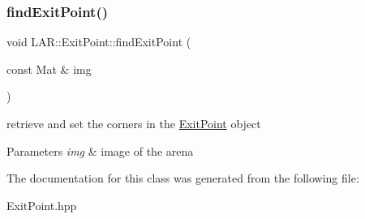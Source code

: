 \subsubsection{\texorpdfstring{find\+Exit\+Point()}{findExitPoint()}}
{\footnotesize\ttfamily void L\+A\+R\+::\+Exit\+Point\+::find\+Exit\+Point (\begin{DoxyParamCaption}\item[{const Mat \&}]{img }\end{DoxyParamCaption})}

retrieve and set the corners in the \mbox{\hyperlink{class_l_a_r_1_1_exit_point}{Exit\+Point}} object 
\begin{DoxyParams}{Parameters}
{\em img} & image of the arena \\
\hline
\end{DoxyParams}


The documentation for this class was generated from the following file\+:\begin{DoxyCompactItemize}
\item 
Exit\+Point.\+hpp\end{DoxyCompactItemize}
